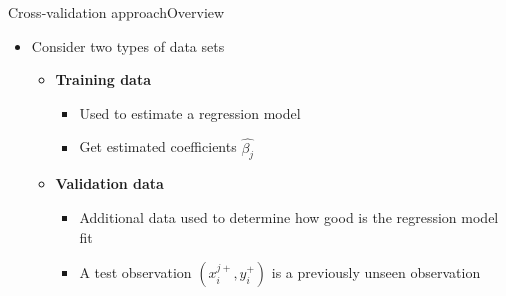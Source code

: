 \documentclass[dvipsnames,hyperref={pdfpagelabels=false}]{beamer}
\begin{document}
\begin{frame}{Cross-validation approach}{Overview}
	\begin{itemize}
			
		
		\item Consider two types of data sets
		\vspace{0.2cm}
		\begin{itemize}
			\item[1.] \textbf{Training data} 
			\vspace{0.2cm}
			\begin{itemize}
				\item Used to estimate a regression model
							\vspace{0.2cm}
				\item Get estimated coefficients $\hat{\beta_{j}}$
			\end{itemize}
			\vspace{0.2cm}
			\item[2.] \textbf{Validation data} 
			\vspace{0.2cm}
			\begin{itemize}
				\item Additional data used to determine how good is the regression model fit
				\vspace{0.2cm}
				\item A test observation $(x^{j+}_{i},y^{+}_{i})$ is a previously unseen observation
			\end{itemize}
		\end{itemize}
	
			
		
	\end{itemize}
\end{frame}



%		
%		
\end{document}
